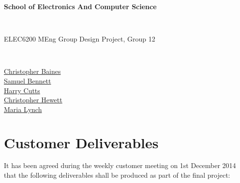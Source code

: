 \documentclass[12pt,a4paper]{article}
\begin{document}

\begin{Large}
\textbf{School of Electronics And Computer Science
}\end{Large}\\

\begin{Large}
ELEC6200 MEng Group Design Project, Group 12
\end{Large}\\

\begin{center}

{\href{mailto:cb15g11@soton.ac.uk}{Christopher Baines}}\\
{\href{mailto:sb21g11@soton.ac.uk}{Samuel Bennett}}\\
{\href{mailto:hc13g11@soton.ac.uk}{Harry Cutts}}\\
{\href{mailto:cjh1e11@soton.ac.uk}{Christopher Hewett}}\\
{\href{mailto:ml26g11@soton.ac.uk}{Maria Lynch}}

\end{center}

\tableofcontents

\section{Customer Deliverables}


It has been agreed during the weekly customer meeting on 1st December 2014 that the following deliverables shall be produced as part of the final project:
\end{document}
